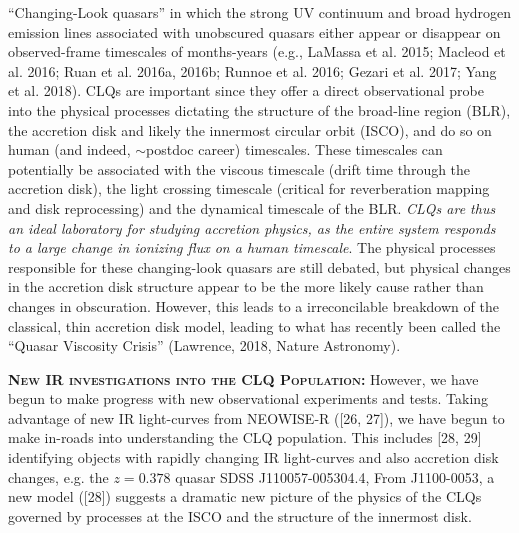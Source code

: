 \documentclass[12pt]{article}
\begin{document}
\smallskip
\smallskip
\noindent
``Changing-Look quasars'' 
 in which the strong UV continuum and broad hydrogen emission lines associated with unobscured quasars either appear or disappear on observed-frame timescales of months-years (e.g., LaMassa et al. 2015; Macleod et al. 2016; Ruan et al. 2016a, 2016b; Runnoe et al. 2016; Gezari et al. 2017; Yang et al. 2018). 
CLQs are important since they offer a direct observational probe into the physical processes dictating the structure of the broad-line region (BLR), the accretion disk and likely the innermost circular orbit (ISCO), 
and do so on human (and indeed, $\sim$postdoc career) timescales. 
These timescales can potentially be associated with the viscous timescale (drift time through the accretion disk), the light crossing timescale (critical for reverberation mapping and disk reprocessing) and the dynamical timescale of the BLR.  {\it CLQs are thus an ideal laboratory for studying accretion physics, as the entire system responds to a large change in ionizing flux on a human timescale}. 
The physical processes responsible for these changing-look quasars are still debated, but physical changes in the accretion disk structure appear to be the more likely cause rather than changes in obscuration. However, this leads to a irreconcilable breakdown of the classical, thin accretion disk model, leading to what has recently been called the ``Quasar Viscosity Crisis'' (Lawrence, 2018, Nature Astronomy). 

\smallskip
\smallskip
\noindent
\textbf{\textsc{New IR investigations into the CLQ Population:}}
However, we have begun to make progress with new
observational experiments and tests.  Taking advantage of new IR
light-curves from NEOWISE-R ([26, 27]), we have begun to make in-roads
into understanding the CLQ population.  This includes [28, 29]
identifying objects with rapidly changing IR light-curves and also
accretion disk changes, e.g. the $z=0.378$ quasar SDSS
J110057-005304.4, 
From J1100-0053, a new model ([28]) suggests a dramatic new picture of the physics of the
CLQs governed by processes at the ISCO and the structure of the
innermost disk.  


\end{document}
